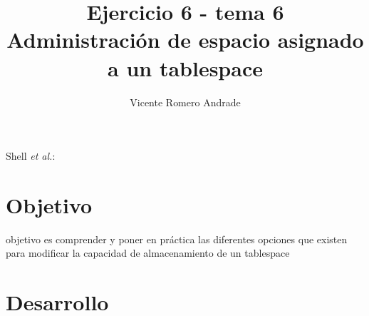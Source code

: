 \documentclass[journal]{IEEEtran}
\begin{document}
\title{Ejercicio 6 - tema 6 \\ Administración de espacio asignado a un tablespace}
%
\author{Vicente Romero Andrade}

%
{Shell \MakeLowercase{\textit{et al.}}: }

\maketitle


\IEEEpeerreviewmaketitle

\section{Objetivo}

 objetivo es comprender y poner en práctica las diferentes opciones que existen 
para modificar la capacidad de almacenamiento de un tablespace
\section{Desarrollo}
\end{document}
